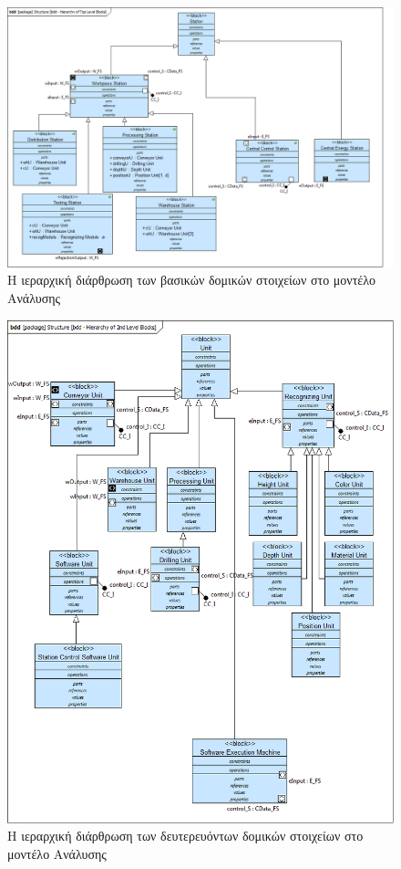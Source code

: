 \documentclass[a4paper,12pt,twoside]{report}
\begin{document}
\begin{appendices}
			\clearpage
			\begin{figure}[hp]
					\centering
					\includegraphics[scale=0.30]{AnalysisModel_bdd-HierarchyofTopLevelBlocks.png}
					\caption{Η ιεραρχική διάρθρωση των βασικών δομικών στοιχείων στο μοντέλο Ανάλυσης}
					\label{φωτ:Η ιεραρχική διάρθρωση των βασικών δομικών στοιχείων στο μοντέλο Ανάλυσης}
			\end{figure}
			
			\begin{figure}[hp]
					\centering
					\includegraphics[scale=0.30]{AnalysisModel_bdd-Hierarchyof2ndLevelBlocks.png}
					\caption{Η ιεραρχική διάρθρωση των δευτερευόντων δομικών στοιχείων στο μοντέλο Ανάλυσης}
					\label{φωτ:Η ιεραρχική διάρθρωση των δευτερευόντων δομικών στοιχείων στο μοντέλο Ανάλυσης}
			\end{figure}
			

\end{appendices}
\end{document}
